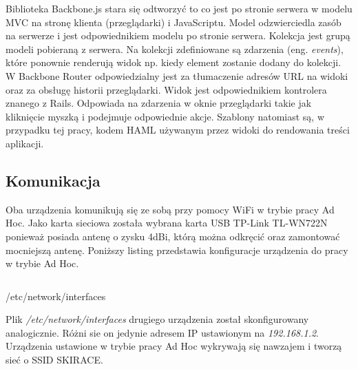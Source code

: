 \documentclass[11pt,a4paper, twoside]{article}
\begin{document}
Biblioteka Backbone.js stara się odtworzyć to co jest po stronie serwera w modelu MVC na stronę klienta (przeglądarki) i JavaScriptu. Model odzwierciedla zasób na serwerze i jest odpowiednikiem modelu po stronie serwera. Kolekcja jest grupą modeli pobieraną z serwera. Na kolekcji zdefiniowane są zdarzenia (eng. \emph{events}), które ponownie renderują widok np. kiedy element zostanie dodany do kolekcji. W Backbone Router odpowiedzialny jest za tłumaczenie adresów URL na widoki oraz za obsługę historii przeglądarki. Widok jest odpowiednikiem kontrolera znanego z Rails. Odpowiada na zdarzenia w oknie przeglądarki takie jak kliknięcie myszką i podejmuje odpowiednie akcje. Szablony natomiast są, w przypadku tej pracy, kodem HAML używanym przez widoki do rendowania treści aplikacji.
\newpage
\subsection{Komunikacja}
Oba urządzenia komunikują się ze sobą przy pomocy WiFi w trybie pracy Ad Hoc. Jako karta sieciowa została wybrana karta USB TP-Link TL-WN722N ponieważ posiada antenę o zysku 4dBi, którą można odkręcić oraz zamontować mocniejszą antenę. Poniższy listing przedstawia konfiguracje urządzenia do pracy w trybie Ad Hoc.
\begin{listing}[H]
\inputminted[linenos=true]{sh}{./src/adhoc}
\caption{/etc/network/interfaces}
\end{listing}
Plik \emph{/etc/network/interfaces} drugiego urządzenia został skonfigurowany analogicznie. Różni sie on jedynie adresem IP ustawionym na \emph{192.168.1.2}. Urządzenia ustawione w trybie pracy Ad Hoc wykrywają się nawzajem i tworzą sieć o SSID SKIRACE.
\end{document}
